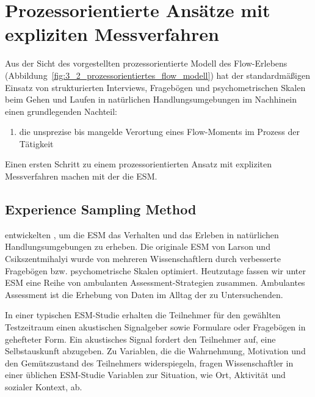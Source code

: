 \section{Prozessorientierte Ansätze mit expliziten Messverfahren} %
\label{sec:prozessorientierte_ansatze_mit_expliziten_messverfahren}

Aus der Sicht des vorgestellten prozessorientierte Modell des Flow-Erlebens (Abbildung~\ref{fig:3_2_prozessorientiertes_flow_modell}) hat der standardmäßigen Einsatz von strukturierten Interviews, Fragebögen und psychometrischen Skalen beim Gehen und Laufen in natürlichen Handlungsumgebungen im Nachhinein einen grundlegenden Nachteil:

\begin{enumerate}
	\item die unsprezise bis mangelde Verortung eines Flow-Moments im Prozess der Tätigkeit 
\end{enumerate}

Einen ersten Schritt zu einem prozessorientierten Ansatz mit expliziten Messverfahren machen \citep{Larson1983} mit der die \ac{ESM}.

\subsection{Experience Sampling Method} %
\label{sub:experience_sampling_method}

\citep{Larson1983} entwickelten \citep{Larson1983}, um die \ac{ESM} das Verhalten und das Erleben in natürlichen Handlungsumgebungen zu erheben. Die originale \ac{ESM} von Larson und Csikszentmihalyi wurde von mehreren Wissenschaftlern \citep[z.~B. ][]{Schallberger2001, Rheinberg2003} durch verbesserte Fragebögen bzw. psychometrische Skalen optimiert. Heutzutage fassen wir unter \ac{ESM} eine Reihe von ambulanten Assessment-Strategien zusammen. Ambulantes Assessment ist die Erhebung von Daten im Alltag der zu Untersuchenden.

In einer typischen \ac{ESM}-Studie erhalten die Teilnehmer für den gewählten Testzeitraum einen akustischen Signalgeber sowie Formulare oder Fragebögen in gehefteter Form. Ein akustisches Signal fordert den Teilnehmer auf, eine Selbstauskunft abzugeben. Zu Variablen, die die Wahrnehmung, Motivation und den Gemütszustand des Teilnehmers widerspiegeln, fragen Wissenschaftler in einer üblichen \ac{ESM}-Studie Variablen zur Situation, wie Ort, Aktivität und sozialer Kontext, ab. 

